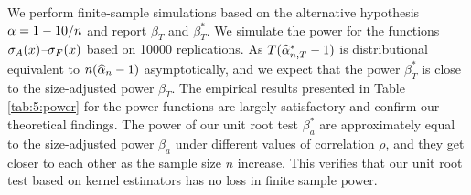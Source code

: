 We perform finite-sample simulations based on the alternative hypothesis $\alpha = 1 - 10 / n$ and report $\beta_T$ and $\beta_T^*$. We simulate the power for the functions $\sigma_A(x)$--$\sigma_F(x)$ based on 10000 replications. As $T(\widehat{\alpha}_{n,T}^* - 1)$ is distributional equivalent to $n(\widehat{\al}_n - 1)$ asymptotically, and we expect that the power $\beta_T^*$ is close to the size-adjusted power $\beta_T$. The empirical results presented in Table \ref{tab:5:power} for the power functions are largely satisfactory and confirm our theoretical findings. The power of our unit root test $\beta^*_a$ are approximately equal to the size-adjusted power $\beta_a$ under different values of correlation $\rho$, and they get closer to each other as the sample size $n$ increase. This verifies that our unit root test based on kernel estimators has no loss in finite sample power.
\begin{table}[!ht] 
\selectfont \caption{The local power of unit root test based on standard critical values $n(\widehat{\al}_n - 1)$ and simulated critical values $T( \widehat{\al}^*_{n,T} - 1)$.}
\label{GseqTable} 
\end{table}



